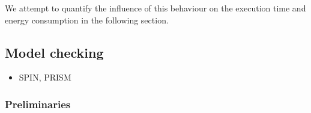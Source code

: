 \documentclass[a4paper, 10pt]{article}
\begin{document}
We attempt to quantify the influence of this behaviour on the execution time and energy consumption in the following section.

\subsection{Model checking}
\label{ssec:analysis-modelchecking}
\begin{itemize}
	\item SPIN\cite{spin, hol97}, PRISM\cite{prism, knp09}
\end{itemize}

\subsubsection{Preliminaries}
\label{sssec:analysis-modelchecking-preliminaries}
\end{document}
